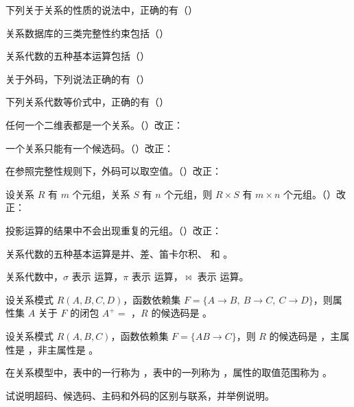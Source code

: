 \documentclass[a4paper,11pt]{article}
\begin{document}
\q 下列关于关系的性质的说法中，正确的有（\quad）

\q 关系数据库的三类完整性约束包括（\quad）

\q 关系代数的五种基本运算包括（\quad）

\q 关于外码，下列说法正确的有（\quad）

\q 下列关系代数等价式中，正确的有（\quad）

\q 任何一个二维表都是一个关系。\quad（\quad）\quad 改正：\fixblank

\q 一个关系只能有一个候选码。\quad（\quad）\quad 改正：\fixblank

\q 在参照完整性规则下，外码可以取空值。\quad（\quad）\quad 改正：\fixblank

\q 设关系 $R$ 有 $m$ 个元组，关系 $S$ 有 $n$ 个元组，则 $R\times S$ 有 $m\times n$ 个元组。\quad（\quad）\quad 改正：\fixblank

\q 投影运算的结果中不会出现重复的元组。\quad（\quad）\quad 改正：\fixblank

\q 关系代数的五种基本运算是并、差、笛卡尔积、\fillblank{} 和 \fillblank{}。

\q 关系代数中，$\sigma$ 表示 \fillblank{} 运算，$\pi$ 表示 \fillblank{} 运算，$\bowtie$ 表示 \fillblank{} 运算。

\q 设关系模式 $R(A,B,C,D)$，函数依赖集 $F=\{A\to B,\ B\to C,\ C\to D\}$，则属性集 $A$ 关于 $F$ 的闭包 $A^{+}=$ \fillblank{}，$R$ 的候选码是 \fillblank{}。

\q 设关系模式 $R(A,B,C)$，函数依赖集 $F=\{AB\to C\}$，则 $R$ 的候选码是 \fillblank{}，主属性是 \fillblank{}，非主属性是 \fillblank{}。

\q 在关系模型中，表中的一行称为 \fillblank{}，表中的一列称为 \fillblank{}，属性的取值范围称为 \fillblank{}。

\q 试说明超码、候选码、主码和外码的区别与联系，并举例说明。\anslines{2.2cm}
\end{document}

